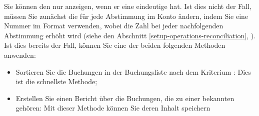 Sie können den  nur anzeigen, wenn er eine eindeutige  hat. Ist dies nicht der Fall, müssen Sie zunächst die  für jede Abstimmung im Konto ändern, indem Sie eine Nummer im Format  verwenden, wobei die Zahl bei jeder nachfolgenden Abstimmung erhöht wird (siehe den Abschnitt \vref{setup-operations-reconciliation}, ). Ist dies bereits der Fall, können Sie eine der beiden folgenden Methoden anwenden:
\begin{itemize}
	\item Sortieren Sie die Buchungen in der Buchungsliste nach dem Kriterium : Dies ist die schnellste Methode;
	\item Erstellen Sie einen Bericht über die Buchungen, die zu einer bekannten  gehören: Mit dieser Methode können Sie deren Inhalt speichern
\end{itemize}


